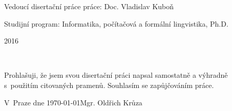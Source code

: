 \documentclass[12pt,notitlepage]{report}
\begin{document}
\begin{titlepage}
\large
\noindent Vedoucí disertační práce práce: Doc. Vladislav Kuboň

\noindent Studijní program: Informatika, počítačová a formální lingvistika, Ph.D.

\vspace{20mm}

\begin{center}
2016
\end{center}

\end{titlepage} %

\thispagestyle{empty} %
\normalsize %
\ \vspace{10mm} 


\vspace{\fill} %
\noindent Prohlašuji, že jsem svou disertační práci napsal samostatně a výhradně s~použitím citovaných pramenů. Souhlasím se zapůjčováním práce.

\bigskip
\noindent V~Praze dne \today \hspace{\fill}Mgr. Oldřich Krůza

\setcounter{page}{2} %
\tableofcontents %

\newpage %



\newpage














\end{document}
